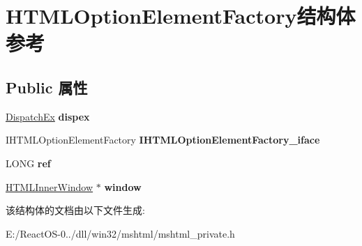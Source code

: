 \hypertarget{struct_h_t_m_l_option_element_factory}{}\section{H\+T\+M\+L\+Option\+Element\+Factory结构体 参考}
\label{struct_h_t_m_l_option_element_factory}
\subsection*{Public 属性}
\begin{DoxyCompactItemize}
\item 
\mbox{\label{struct_h_t_m_l_option_element_factory_a4c747a1700da53d9f000e6b52da51d86}} 
\hyperlink{struct_dispatch_ex}{Dispatch\+Ex} {\bfseries dispex}
\item 
\mbox{\label{struct_h_t_m_l_option_element_factory_aca75db44a0b5664b7bd7101cfd74ca36}} 
I\+H\+T\+M\+L\+Option\+Element\+Factory {\bfseries I\+H\+T\+M\+L\+Option\+Element\+Factory\+\_\+iface}
\item 
\mbox{\label{struct_h_t_m_l_option_element_factory_abaf27ed8e4828372a2d3d3b9ab3810f7}} 
L\+O\+NG {\bfseries ref}
\item 
\mbox{\label{struct_h_t_m_l_option_element_factory_a9997139d8cca6e89e23dc2f69b834ba1}} 
\hyperlink{struct_h_t_m_l_inner_window}{H\+T\+M\+L\+Inner\+Window} $\ast$ {\bfseries window}
\end{DoxyCompactItemize}


该结构体的文档由以下文件生成\+:\begin{DoxyCompactItemize}
\item 
E\+:/\+React\+O\+S-\/0../dll/win32/mshtml/mshtml\+\_\+private.\+h\end{DoxyCompactItemize}
